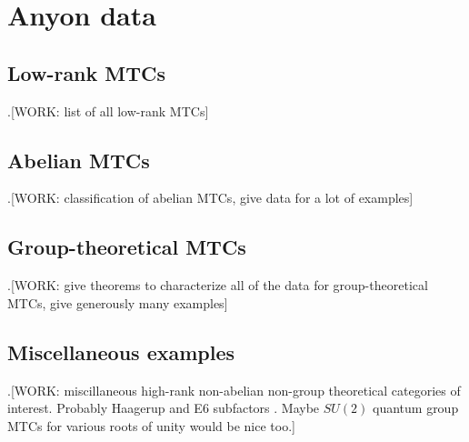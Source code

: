 \section{Anyon data}

\subsection{Low-rank MTCs}

.[WORK: list of all low-rank MTCs]

\subsection{Abelian MTCs}

.[WORK: classification of abelian MTCs, give data for a lot of examples]

\subsection{Group-theoretical MTCs}

.[WORK: give theorems to characterize all of the data for group-theoretical MTCs, give generously many examples]

\subsection{Miscellaneous examples}

.[WORK: miscillaneous high-rank non-abelian non-group theoretical categories of interest. Probably Haagerup and E6 subfactors \cite{hong2008exotic}. Maybe $SU(2)$ quantum group MTCs for various roots of unity would be nice too.]